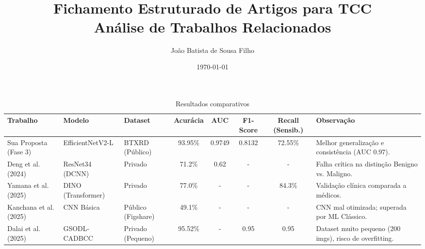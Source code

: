 \documentclass[12pt, a4paper]{article}
\title{\textbf{Fichamento Estruturado de Artigos para TCC \\ \large Análise de Trabalhos Relacionados}}
\author{João Batista de Sousa Filho}
\date{\today}
\begin{document}
\maketitle

\begin{table}[ht]
\centering
\small
\caption{Resultados comparativos}
\label{tab:comparative_results}
\begin{tabular}{lllccccp{6cm}}
\hline
\textbf{Trabalho} & \textbf{Modelo} & \textbf{Dataset} & \textbf{Acurácia} & \textbf{AUC} & \textbf{F1-Score} & \textbf{Recall (Sensib.)} & \textbf{Observação} \\ \hline
Sua Proposta (Fase 3) & EfficientNetV2-L & BTXRD (Público) & 93.95\% & 0.9749 & 0.8132 & 72.55\% & Melhor generalização e consistência (AUC 0.97). \\
Deng et al. (2024) & ResNet34 (DCNN) & Privado & 71.2\% & 0.62 & - & - & Falha crítica na distinção Benigno vs. Maligno. \\
Yamana et al. (2025) & DINO (Transformer) & Privado & 77.0\% & - & - & 84.3\% & Validação clínica comparada a médicos. \\
Kanchana et al. (2025) & CNN Básica & Público (Figshare) & 49.1\% & - & - & - & CNN mal otimizada; superada por ML Clássico. \\
Dalai et al. (2025) & GSODL-CADBCC & Privado (Pequeno) & 95.52\% & - & 0.95 & 0.95 & Dataset muito pequeno (200 imgs), risco de overfitting. \\
\hline
\end{tabular}
\end{table}

\end{document}
